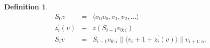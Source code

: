 \documentclass{article}
\theoremstyle{definition}
\newtheorem{definition}{Definition}[section]
\DeclareMathOperator{\concat}{\parallel}
\begin{document}
\begin{definition}\label{def:skip}
\begin{eqnarray}
S_0 v &=& \langle \sigma_0 v_0, v_1, v_2, \ldots \rangle \\
z^\prime_i (v) &\equiv& z(S_{i-1} v_{0:i}) \\
S_i v &=&
S_{i-1} v_{0:i}
\concat \langle v_i + 1 + z^\prime_i(v) \rangle
\concat v_{i+1:n}.
\end{eqnarray}
\end{definition}




\end{document}
